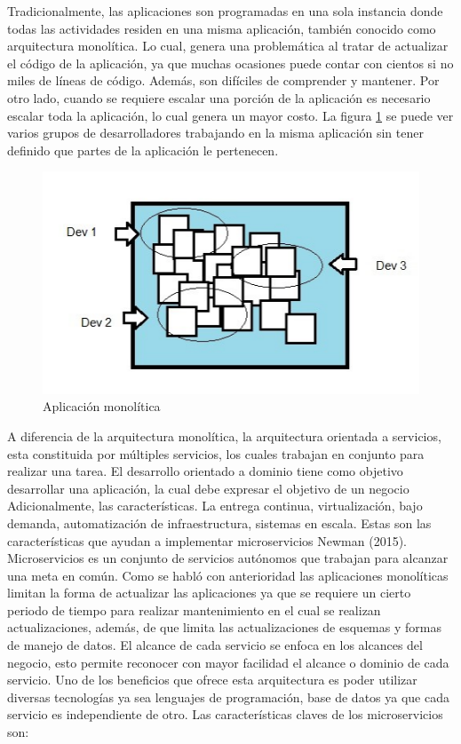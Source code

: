 \documentclass[12pt,twoside]{reedthesis}
\begin{document}
Tradicionalmente, las aplicaciones son programadas en una sola instancia donde todas las actividades residen en una misma aplicación, también conocido como arquitectura monolítica. Lo cual, genera una problemática al tratar de actualizar el código de la aplicación, ya que muchas ocasiones puede contar con cientos si no miles de líneas de código. Además, son difíciles de comprender y mantener. Por otro lado, cuando se requiere escalar una porción de la aplicación es necesario escalar toda la aplicación, lo cual genera un mayor costo. La figura \ref{figura1} se puede ver varios grupos de desarrolladores trabajando en la misma aplicación sin tener definido que partes de la aplicación le pertenecen.
\begin{figure}[h!]
  \centering
  \includegraphics[scale=0.5]{./figure/Cap3/monoFig1.png}
  \caption{Aplicación monolítica}\label{figura1}
\end{figure}
A diferencia de la arquitectura monolítica, la arquitectura orientada a servicios, esta constituida por múltiples servicios, los cuales trabajan en conjunto para realizar una tarea.
El desarrollo orientado a dominio tiene como objetivo desarrollar una aplicación, la cual debe expresar el objetivo de un negocio Adicionalmente, las características. La entrega continua, virtualización, bajo demanda, automatización de infraestructura, sistemas en escala. Estas son las características que ayudan a implementar microservicios Newman (2015). Microservicios es un conjunto de servicios autónomos que trabajan para alcanzar una meta en común. Como se habló con anterioridad las aplicaciones monolíticas limitan la forma de actualizar las aplicaciones ya que se requiere un cierto periodo de tiempo para realizar mantenimiento en el cual se realizan actualizaciones, además, de que limita las actualizaciones de esquemas y formas de manejo de datos. El alcance de cada servicio se enfoca en los alcances del negocio, esto permite reconocer con mayor facilidad el alcance o dominio de cada servicio. Uno de los beneficios que ofrece esta arquitectura es poder utilizar diversas tecnologías ya sea lenguajes de programación, base de datos ya que cada servicio es independiente de otro. Las características claves de los microservicios son:
\end{document}

